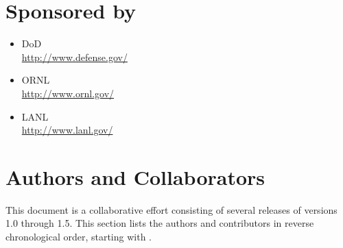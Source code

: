 \pagebreak{}

\section*{Sponsored by}
\begin{itemize}
\item \ac{DoD}\\
  \url{http://www.defense.gov/ }
\item \ac{ORNL}\\
  \url{http://www.ornl.gov/}
\item \ac{LANL}\\
  \url{http://www.lanl.gov/}
\end{itemize}

\section*{Authors and Collaborators}
This document is a collaborative effort consisting of several releases of \openshmem versions 1.0 through 1.5. This section lists the authors and contributors in reverse chronological order, starting with .


